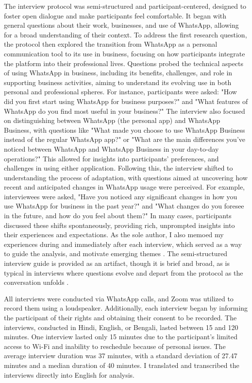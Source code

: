 The interview protocol was semi-structured and participant-centered, designed to foster open dialogue and make participants feel comfortable. It began with general questions about their work, businesses, and use of WhatsApp, allowing for a broad understanding of their context. To address the first research question, the protocol then explored the transition from WhatsApp as a personal communication tool to its use in business, focusing on how participants integrate the platform into their professional lives. Questions probed the technical aspects of using WhatsApp in business, including its benefits, challenges, and role in supporting business activities, aiming to understand its evolving use in both personal and professional spheres. For instance, participants were asked: "How did you first start using WhatsApp for business purposes?" and "What features of WhatsApp do you find most useful in your business?" The interview also focused on distinguishing between WhatsApp (the personal app) and WhatsApp Business, with questions like "What made you choose to use WhatsApp Business instead of the regular WhatsApp app?" or "What are the main differences you’ve noticed between WhatsApp and WhatsApp Business in your day-to-day operations?" This allowed for insights into participants' preferences, and challenges in using either application. Following this, the interview shifted to understanding the process of adaptation, with questions aimed at uncovering how recent and anticipated changes in WhatsApp usage were perceived. For example, interviewees were asked, "Have you noticed any significant changes in how you use WhatsApp for business in the past year?" and "What changes do you foresee in the future, and how do you feel about them?" In many cases, participants discussed these shifts spontaneously, providing rich, unprompted insights into their experiences and expectations. As the sole author, I also memoed my experiences during and immediately  after each interview, which served as a way to guide the analysis, and motivate emerging themes \cite{10.1145/3359174, 10.1145/3491101.3516392}. The semi-structured interview guide is provided as an artifact, though it is brief and broad, as is typical in interviews where questions evolve and depart from the protocol as the conversation unfolds \cite{roulston2018qualitative}.




All interviews were conducted via WhatsApp calls, and Zoom was utilized to record them using a loudspeaker. Additionally, each interview began by informing the participant of their rights and obtaining their consent to be recorded. The interviews, conducted in Hindi, English, or Bengali, lasted between 15 and 120 minutes. One interview lasted only 15 minutes due to the participant's limited access to Wi-Fi and inability to reschedule because of personal issues. The average interview duration was 37 minutes, with a standard deviation of 27.47 minutes and a median duration of 40 minutes. I translated and transcribed the interviews directly into English for analysis. 

